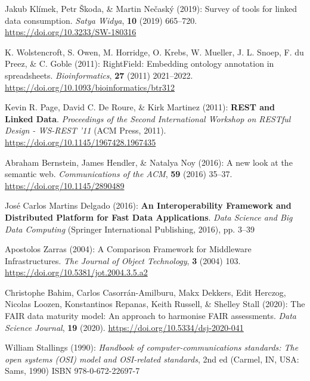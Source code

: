 \begin{thebibliography}{9}
Jakub Klímek, Petr Škoda, \& Martin Nečaský (2019): Survey of tools for
linked data consumption. \emph{Satya Widya}, \textbf{10} (2019)
665--720.
\url{https://doi.org/10.3233/SW-180316}

K. Wolstencroft, S. Owen, M. Horridge, O. Krebs, W. Mueller, J. L.
Snoep, F. du Preez, \& C. Goble (2011): {RightField}: Embedding ontology
annotation in spreadsheets. \emph{Bioinformatics}, \textbf{27} (2011)
2021--2022.
\url{https://doi.org/10.1093/bioinformatics/btr312}

Kevin R. Page, David C. De Roure, \& Kirk Martinez (2011):
\textbf{{REST} and {Linked Data}}. \emph{Proceedings of the {Second
International Workshop} on {RESTful Design} - {WS-REST} '11} ({ACM
Press}, 2011).
\url{https://doi.org/10.1145/1967428.1967435}

Abraham Bernstein, James Hendler, \& Natalya Noy (2016): A new look at
the semantic web. \emph{Communications of the ACM}, \textbf{59} (2016)
35--37.
\url{https://doi.org/10.1145/2890489}

José Carlos Martins Delgado (2016): \textbf{An {Interoperability
Framework} and {Distributed Platform} for {Fast Data Applications}}.
\emph{Data {Science} and {Big Data Computing}} ({Springer International
Publishing}, 2016), pp. 3--39

Apostolos Zarras (2004): A {Comparison Framework} for {Middleware
Infrastructures}. \emph{The Journal of Object Technology}, \textbf{3}
(2004) 103.
\url{https://doi.org/10.5381/jot.2004.3.5.a2}

Christophe Bahim, Carlos Casorrán-Amilburu, Makx Dekkers, Edit Herczog,
Nicolas Loozen, Konstantinos Repanas, Keith Russell, \& Shelley Stall
(2020): The {FAIR} data maturity model: {An} approach to harmonise
{FAIR} assessments. \emph{Data Science Journal}, \textbf{19} (2020).
\url{https://doi.org/10.5334/dsj-2020-041}

William Stallings (1990): \emph{Handbook of computer-communications
standards: {The} open systems ({OSI}) model and {OSI-related}
standards}, 2nd ed ({Carmel, IN, USA}: {Sams}, 1990) ISBN
978-0-672-22697-7


\end{thebibliography}
